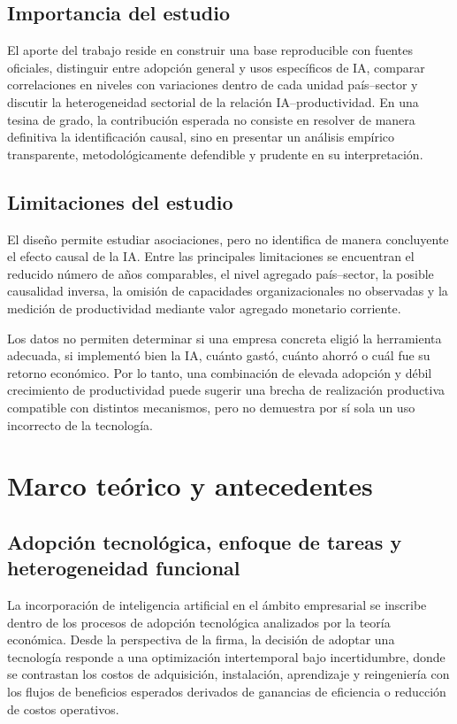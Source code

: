 \documentclass[12pt,a4paper]{article}
\begin{document}
\subsection{Importancia del estudio}

El aporte del trabajo reside en construir una base reproducible con fuentes oficiales, distinguir entre adopción general y usos específicos de IA, comparar correlaciones en niveles con variaciones dentro de cada unidad país--sector y discutir la heterogeneidad sectorial de la relación IA--productividad. En una tesina de grado, la contribución esperada no consiste en resolver de manera definitiva la identificación causal, sino en presentar un análisis empírico transparente, metodológicamente defendible y prudente en su interpretación.

\subsection{Limitaciones del estudio}

El diseño permite estudiar asociaciones, pero no identifica de manera concluyente el efecto causal de la IA. Entre las principales limitaciones se encuentran el reducido número de años comparables, el nivel agregado país--sector, la posible causalidad inversa, la omisión de capacidades organizacionales no observadas y la medición de productividad mediante valor agregado monetario corriente.

Los datos no permiten determinar si una empresa concreta eligió la herramienta adecuada, si implementó bien la IA, cuánto gastó, cuánto ahorró o cuál fue su retorno económico. Por lo tanto, una combinación de elevada adopción y débil crecimiento de productividad puede sugerir una brecha de realización productiva compatible con distintos mecanismos, pero no demuestra por sí sola un uso incorrecto de la tecnología.

\section{Marco teórico y antecedentes}

\subsection{Adopción tecnológica, enfoque de tareas y heterogeneidad funcional}

La incorporación de inteligencia artificial en el ámbito empresarial se inscribe dentro de los procesos de adopción tecnológica analizados por la teoría económica. Desde la perspectiva de la firma, la decisión de adoptar una tecnología responde a una optimización intertemporal bajo incertidumbre, donde se contrastan los costos de adquisición, instalación, aprendizaje y reingeniería con los flujos de beneficios esperados derivados de ganancias de eficiencia o reducción de costos operativos.
\end{document}
